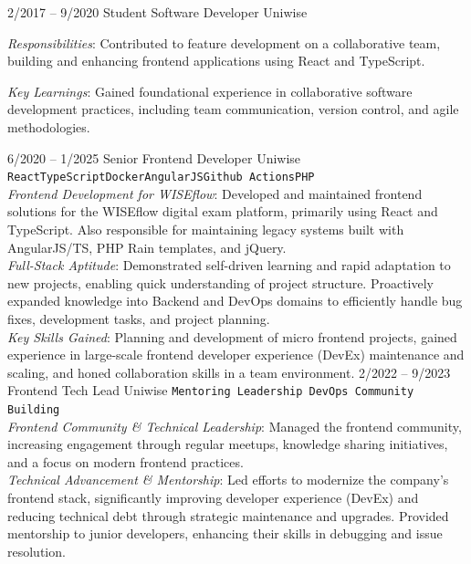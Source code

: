 \documentclass[9pt]{developercv} %
\begin{document}

\begin{entrylist}
	\entry
		{2/2017 -- 9/2020}
		{Student Software Developer}
		{Uniwise}
		{

			\textit{Responsibilities}: Contributed to feature development on a collaborative team, building and enhancing frontend applications using React and TypeScript.

			\textit{Key Learnings}: Gained foundational experience in collaborative software development practices, including team communication, version control, and agile methodologies.
		}
	\entry
		{6/2020 -- 1/2025}
		{Senior Frontend Developer}
		{Uniwise}
		{
			\texttt{React}\slashsep\texttt{TypeScript}\slashsep\texttt{Docker}\slashsep\texttt{AngularJS}\slashsep\texttt{Github Actions}\slashsep\texttt{PHP}\\

			\textit{Frontend Development for WISEflow}: Developed and maintained frontend solutions for the WISEflow digital exam platform, primarily using React and TypeScript. Also responsible for maintaining legacy systems built with AngularJS/TS, PHP Rain templates, and jQuery.\\

			\textit{Full-Stack Aptitude}: Demonstrated self-driven learning and rapid adaptation to new projects, enabling quick understanding of project structure. Proactively expanded knowledge into Backend and DevOps domains to efficiently handle bug fixes, development tasks, and project planning.\\

			\textit{Key Skills Gained}: Planning and development of micro frontend projects, gained experience in large-scale frontend developer experience (DevEx) maintenance and scaling, and honed collaboration skills in a team environment.
		}
	\entry
		{2/2022 -- 9/2023}
		{Frontend Tech Lead}
		{Uniwise}
		{
			\texttt{Mentoring \slashsep Leadership \slashsep DevOps \slashsep Community Building}\\

			\textit{Frontend Community \& Technical Leadership}: Managed the frontend community, increasing engagement through regular meetups, knowledge sharing initiatives, and a focus on modern frontend practices.\\

			\textit{Technical Advancement \& Mentorship}: Led efforts to modernize the company's frontend stack, significantly improving developer experience (DevEx) and reducing technical debt through strategic maintenance and upgrades. Provided mentorship to junior developers, enhancing their skills in debugging and issue resolution.\\

}
\end{entrylist}
\end{document}
